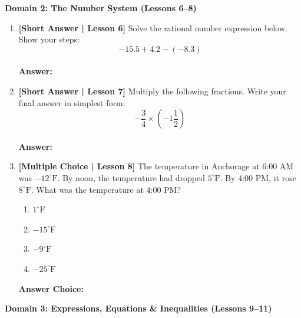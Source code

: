 \documentclass[12pt, letterpaper, fleqn]{article}
\newcommand{\blankshorter}{\underline{\hspace{2.0cm}}}
\newcommand{\blanklong}{\underline{\hspace{6.5cm}}}
\begin{document}
\begin{tcolorbox}[colback=white, colframe=black, arc=2mm]
    \textbf{Domain 2: The Number System (Lessons 6--8)}
\end{tcolorbox}

\begin{enumerate}[leftmargin=0.6cm, itemsep=\fill, start=5]

\item \textbf{[Short Answer | Lesson 6]} Solve the rational number expression below. Show your steps:
$$-15.5 + 4.2 - (-8.3)$$
\vspace{1.5cm} \\
\textbf{Answer:} \blanklong

\item \textbf{[Short Answer | Lesson 7]} Multiply the following fractions. Write your final answer in simplest form:
$$-\frac{3}{4} \times \left( -1\frac{1}{2} \right)$$
\vspace{1.5cm} \\
\textbf{Answer:} \blanklong

\item \textbf{[Multiple Choice | Lesson 8]} The temperature in Anchorage at 6:00 AM was $-12^\circ\text{F}$. By noon, the temperature had dropped $5^\circ\text{F}$. By 4:00 PM, it rose $8^\circ\text{F}$. What was the temperature at 4:00 PM?
\begin{enumerate}[label=\Alph*)]
    \item $1^\circ\text{F}$
    \item $-15^\circ\text{F}$
    \item $-9^\circ\text{F}$
    \item $-25^\circ\text{F}$
\end{enumerate}
\textbf{Answer Choice:} \blankshorter

\end{enumerate}

\vspace{0.5cm}

\begin{tcolorbox}[colback=white, colframe=black, arc=2mm]
    \textbf{Domain 3: Expressions, Equations \& Inequalities (Lessons 9--11)}
\end{tcolorbox}
\end{document}
